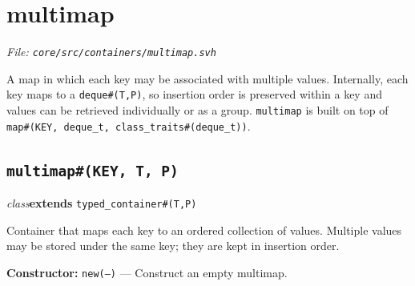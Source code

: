 \documentclass[11pt,letterpaper]{report}
\begin{document}
\section{multimap}
\noindent\small\textit{File: \texttt{core/src/containers/multimap.svh}}\par

A map in which each key may be associated with multiple values. Internally, each key maps to a \texttt{deque\#(T,P)}, so insertion order is preserved within a key and values can be retrieved individually or as a group. \texttt{multimap} is built on top of \texttt{map\#(KEY, deque\_t, class\_traits\#(deque\_t))}.

\subsection*{\texttt{multimap\#(KEY, T, P)}}
\noindent\small\textit{class}\quad \textbf{extends} \texttt{typed\_container\#(T,P)}\par

Container that maps each key to an ordered collection of values. Multiple values may be stored under the same key; they are kept in insertion order.

\noindent\textbf{Constructor:} \texttt{new(---)} --- Construct an empty multimap.
\end{document}
